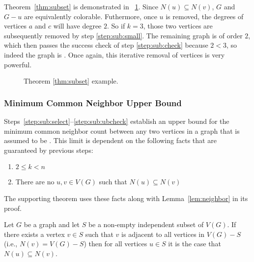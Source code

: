 Theorem~\ref{thm:subset} is demonstrated in \figurename~\ref{fig:subset}.  Since \(N(u)\subseteq N(v)\), \(G\) and
\(G-u\) are equivalently colorable.  Futhermore, once \(u\) is removed, the degrees of vertices \(a\) and \(c\)
will have degree \(2\).  So if \(k=3\), those two vertices are subsequently removed by step \ref{step:sub:small}.
The remaining graph is of order \(2\), which then passes the success check of step \ref{step:sub:check} because
\(2<3\), so indeed the graph is .  Once again, this iterative removal of vertices is very powerful.

\begin{figure}[H]
  \centering
  \caption{Theorem \ref{thm:subset} example.}
  \label{fig:subset}
\end{figure}

\subsubsection{Minimum Common Neighbor Upper Bound}\label{sec:sub:sub:common}

Steps~\ref{step:sub:select}--\ref{step:sub:ubcheck} establish an upper bound for the minimum common neighbor count
between any two vertices in a graph that is assumed to be .  This limit is dependent on the following
facts that are guaranteed by previous steps:

\begin{enumerate}
\item \(2\le k<n\)
\item There are no \(u,v\in V(G)\) such that \(N(u)\subseteq N(v)\)
\end{enumerate}

The supporting theorem uses these facts along with Lemma~\ref{lem:neighbor} in its proof.

\begin{lemma}
  \label{lem:neighbor}
  Let \(G\) be a graph and let \(S\) be a non-empty independent subset of \(V(G)\).  If there exists a vertex
  \(v\in S\) such that \(v\) is adjacent to all vertices in \(V(G)-S\) (i.e., \(N(v)=V(G)-S\)) then for all
  vertices \(u\in S\) it is the case that \(N(u)\subseteq N(v)\).
\end{lemma}

